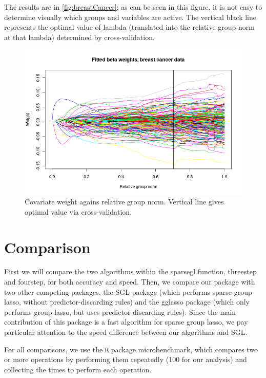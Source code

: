 \documentclass[12pt]{article}
\newcommand{\pkg}[1]{{\normalfont\fontseries{b}\selectfont #1}}
\begin{document}
The results are in \autoref{fig:breastCancer}; as can be seen in this figure, it is not easy to determine visually which groups and variables are active. The vertical black line represents the optimal value of lambda (translated into the relative group norm at that lambda) determined by cross-validation.


\begin{figure}[tb!]
\centering
\includegraphics[scale=0.5]{breast_cancer_w_vertline.png}
\caption{Covariate weight agains relative group norm. Vertical line gives optimal value via cross-validation.}
\label{fig:breastCancer}
\end{figure}



\section{Comparison}

First we will compare the two algorithms within the sparsegl function, threestep and fourstep, for both accuracy and speed. Then, we compare our package with two other competing packages, the \pkg{SGL} package (which performs sparse group lasso, without predictor-discarding rules) and the \pkg{gglasso} package (which only performs group lasso, but uses predictor-discarding rules). Since the main contribution of this package is a fast algorithm for sparse group lasso, we pay particular attention to the speed difference between our algorithms and SGL.

For all comparisons, we use the \texttt{R} package \pkg{microbenchmark}, which compares two or more operations by performing them repeatedly (100 for our analysis) and collecting the times to perform each operation.
\end{document}
